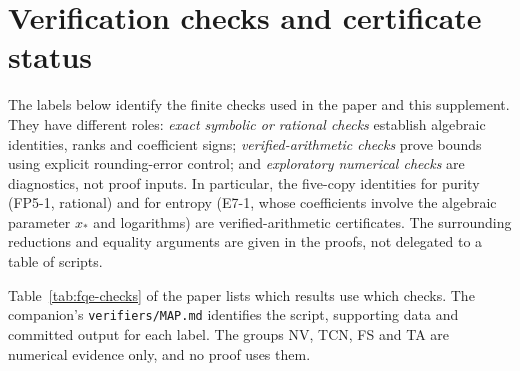 \section{Verification checks and certificate status}\label{sec:sup-verifiers}
The labels below identify the finite checks used in the paper and this supplement. They have
different roles: \emph{exact symbolic or rational checks} establish algebraic
identities, ranks and coefficient signs; \emph{verified-arithmetic checks}
prove bounds using explicit rounding-error control; and
\emph{exploratory numerical checks} are diagnostics, not proof inputs.
In particular, the five-copy identities for purity (FP5-1, rational) and for
entropy (E7-1, whose coefficients involve the algebraic parameter $x_*$ and
logarithms) are verified-arithmetic certificates.
The surrounding reductions and equality arguments are given in the
proofs, not delegated to a table of scripts.

Table~\ref{tab:fqe-checks} of the paper lists which results use which checks. The companion's
\texttt{verifiers/MAP.md} identifies the script, supporting data and
committed output for each label. The groups NV, TCN, FS and TA are
numerical evidence only, and no proof uses them.



